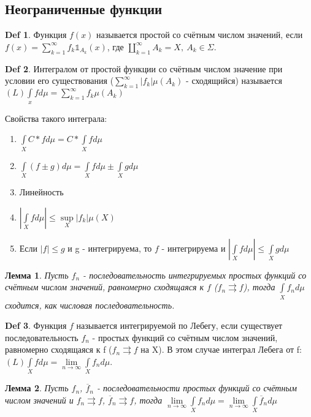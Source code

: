 \documentclass[14pt]{article}
\theoremstyle{plain}
\newtheorem{Lem}{Лемма}
\theoremstyle{definition}
\newtheorem{Def}{Def}
\begin{document}
		\subsection{Неограниченные функции}
			\begin{Def}
				Функция $f(x)$ называется простой со счётным числом значений, если $f(x) = \sum\limits_{k=1}^{\infty} f_k \mathbb{1}_{A_k}(x)$, где $\coprod\limits_{k=1}^{\infty} A_k = X, \ A_k \in \Sigma$.
			\end{Def}
			\begin{Def}
				Интегралом от простой функции со счётным числом значение при условии его существования ($\sum\limits_{k=1}^{\infty} |f_k| \mu(A_k)$ - сходящийся) называется $(L)\int\limits_x f d\mu = \sum\limits_{k=1}^{\infty} f_k \mu(A_k) $
			\end{Def}
			Свойства такого интеграла:
			\begin{enumerate}
				\item $\int\limits_{X}C* f d\mu = C* \int\limits_{X} f d\mu$
				\item $\int\limits_{X} (f \pm g) d\mu = \int\limits_{X} f d\mu \pm \int\limits_{X} g d\mu$
				\item Линейность
				\item $| \int\limits_{X} fd\mu| \leq \sup\limits_{X}{|f_k|} \mu (X)$
				\item Если $|f| \leq g$ и g - интегрируема, то $f$ - интегрируема и $|\int\limits_X f d\mu | \leq \int\limits_X g d\mu$
			\end{enumerate}
			\begin{Lem}
				Пусть $f_n$ - последовательность интегрируемых простых функций со счётным числом значений, равномерно сходящаяся к $f$ ($f_n \rightrightarrows f$), тогда $\int\limits_X f_n d\mu$ сходится, как числовая последовательность. 
			\end{Lem}
			\begin{Def}
				Функция $f$ называется интегрируемой по Лебегу, если существует последовательность $f_n$ - простых функций со счётным числом значений, равномерно сходящаяся к f ($f_n \rightrightarrows f$ на X). В этом случае интеграл Лебега от f: $(L) \int\limits_X f d\mu = \lim\limits_{n \to \infty} \int\limits_X f_n d\mu $. 
			\end{Def}
			\begin{Lem}
				Пусть $f_n$, $\overline{f}_n$ - последовательности простых функций со счётным числом значений и $f_n \rightrightarrows f$, $\overline{f}_n \rightrightarrows f$, тогда $\lim\limits_{n \to \infty} \int\limits_X f_n d\mu = \lim\limits_{n \to \infty} \int\limits_X \overline{f}_n d\mu$
			\end{Lem}
\end{document}
